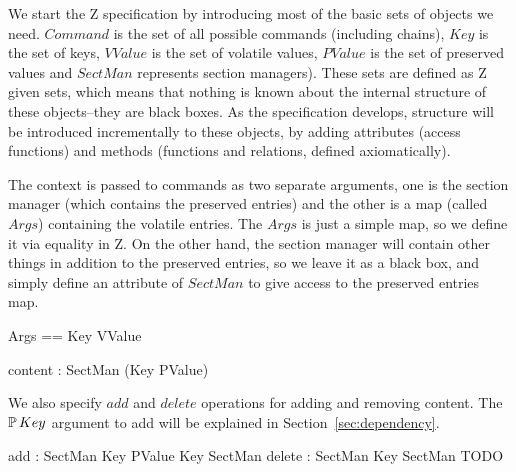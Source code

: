 \documentclass{llncs} %
\begin{document}
We start the Z specification by introducing most of the basic
sets of objects we need.  $Command$ is the set of all possible
commands (including chains), $Key$ is the set of keys, $VValue$ is the set
of volatile values, $PValue$ is the set of preserved values and $SectMan$
represents section managers).  These sets are defined as Z given sets, which
means that nothing is known about the internal structure of these
objects--they are black boxes.  As the specification develops,
structure will be introduced incrementally to these objects, by adding
attributes (access functions) and methods (functions and relations, defined
axiomatically).
\begin{zed}
\end{zed}

The context is passed to commands as two separate arguments, one
is the section manager (which contains the preserved entries) and the other
is a map (called $Args$) containing the volatile entries.  The $Args$
is just a simple map, so we define it via equality in Z.  On the other
hand, the section manager will contain other things in addition to the
preserved entries, so we leave it as a black box, and simply define an
attribute of $SectMan$ to give access to the preserved entries map.
\begin{zed}
  Args == Key \ffun VValue
\end{zed}

\begin{zed}
  content : SectMan \fun (Key \ffun PValue)
\end{zed}

We also specify $add$ and $delete$ operations for adding and removing
content.  The $\power Key$ argument to add will be explained in
Section~\ref{sec:dependency}.
\begin{axdef}
  add : SectMan \cross Key \cross PValue \cross \power Key \rel SectMan
  delete : SectMan \cross Key \rel SectMan
\where
  TODO
\end{axdef}
\end{document}
